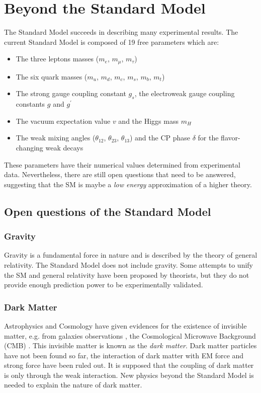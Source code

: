 \section{Beyond the Standard Model}
\label{sec:BeyondSM}

The Standard Model succeeds in describing many experimental results. The current Standard Model is composed of 19 free parameters which are:
\begin{itemize}[noitemsep]
  \item The three leptons masses ($m_e$, $m_{\mu}$, $m_{\tau}$)
  \item The six quark masses ($m_u$, $m_d$, $m_c$, $m_s$, $m_b$, $m_t$)
  \item The strong gauge coupling constant $g_s$, the electroweak gauge coupling constants $g$ and $g^{\prime}$
  \item The vacuum expectation value $v$ and the Higgs mass $m_H$
  \item The weak mixing angles ($\theta_{12}$, $\theta_{23}$, $\theta_{13}$) and the CP phase $\delta$ for the flavor-changing weak decays \cite{Kobayashi:1973pt}
\end{itemize}
These parameters have their numerical values determined from experimental data. Nevertheless, there are still open questions that need to be answered, suggesting that the SM is maybe a \textit{low energy} approximation of a higher theory.

\subsection{Open questions of the Standard Model}

\subsubsection*{Gravity}

Gravity is a fundamental force in nature and is described by the theory of general relativity. The Standard Model does not include gravity. Some attempts to unify the SM and general relativity have been proposed by theorists, but they do not provide enough prediction power to be experimentally validated.

\subsubsection*{Dark Matter}

Astrophysics and Cosmology have given evidences for the existence of invisible matter, e.g. from galaxies observations \cite{Battistelli:2017zrp}, the Cosmological Microwave Background (CMB) \cite{Giesen:2012rp}. This invisible matter is known as the \textit{dark matter}. Dark matter particles have not been found so far, the interaction of dark matter with EM force and strong force have been ruled out. It is supposed that the coupling of dark matter is only through the weak interaction. New physics beyond the Standard Model is needed to explain the nature of dark matter.

